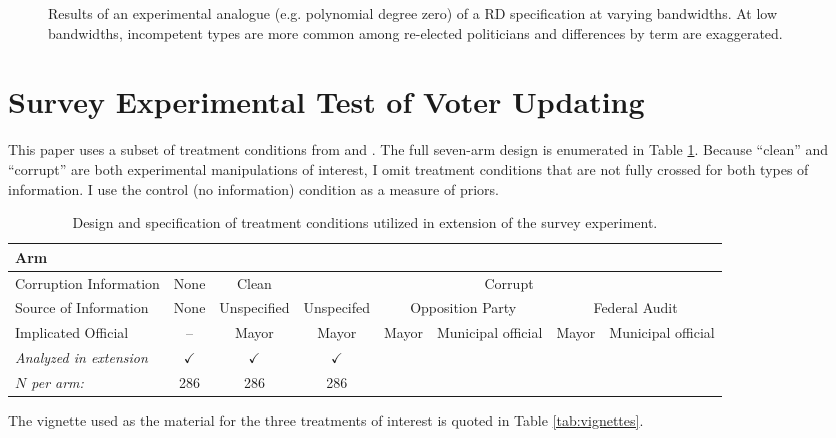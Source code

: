 \documentclass[11pt,english]{article}
\begin{document}
\begin{figure}
\caption{Results of an experimental analogue (e.g. polynomial degree zero) of a RD specification at varying bandwidths. At low bandwidths, incompetent types are more common among re-elected politicians and differences by term are exaggerated.}\label{fig:rdshirk}
\end{figure}

\section{Survey Experimental Test of Voter Updating}

This paper uses a subset of treatment conditions from \citet{weitzshapirowinters2016} and \citet{wintersweitzshapiro2016}. The full seven-arm design is enumerated in Table \ref{tab:wsw}. Because ``clean'' and ``corrupt'' are both experimental manipulations of interest, I omit treatment conditions that are not fully crossed for both types of information. I use the control (no information) condition as a measure of priors.

\begin{table}[H]
\begin{tabular}{p{2cm}||p{1.5cm}|c|c|c|p{1.5cm}|c|p{1.5cm}}\hline
Arm  \\ \hline\hline
Corruption Information &\multicolumn{1}{c|}{None} & \multicolumn{1}{c|}{Clean} &\multicolumn{5}{c}{Corrupt} \\ \hline
Source of Information & \multicolumn{1}{c|}{None}& Unspecified & Unspecifed & \multicolumn{2}{c|}{Opposition Party} & \multicolumn{2}{c}{Federal Audit}\\ \hline
Implicated Official &\multicolumn{1}{c|}{--} & Mayor & Mayor & Mayor & Municipal official & Mayor & Municipal official \\ \hline \hline
\emph{Analyzed in extension} & \multicolumn{1}{c|}{$\checkmark$} & $\checkmark$ & $\checkmark$ &&&&\\  \hline
\emph{$N$ per arm:} & \multicolumn{1}{c|}{286} & 286 & 286 &&&\\ \hline
\end{tabular}
\caption{Design and specification of treatment conditions utilized in extension of the survey experiment.}\label{tab:wsw}
\end{table}

The vignette used as the material for the three treatments of interest is quoted in Table \ref{tab:vignettes}.
\end{document}
